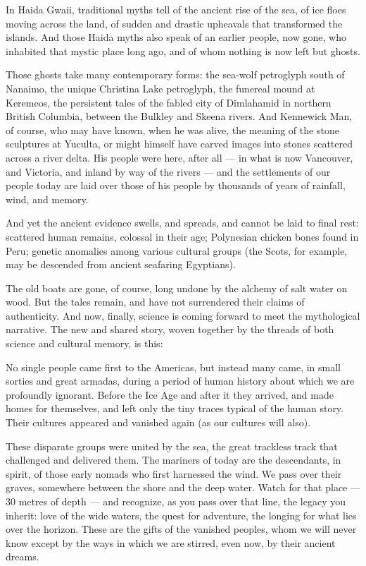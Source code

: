 \documentclass[letterpaper,oneside]{memoir}
\begin{document}
\begin{description}
In Haida Gwaii, traditional myths tell of the ancient rise of the sea,
of ice floes moving across the land, of sudden and drastic upheavals
that transformed the islands. And those Haida myths also speak of an
earlier people, now gone, who inhabited that mystic place long ago,
and of whom nothing is now left but ghosts.

Those ghosts take many contemporary forms: the sea-wolf petroglyph
south of Nanaimo, the unique Christina Lake petroglyph, the funereal
mound at Keremeos, the persistent tales of the fabled city of
Dimlahamid in northern British Columbia, between the Bulkley and
Skeena rivers. And Kennewick Man, of course, who may have known, when
he was alive, the meaning of the stone sculptures at Yuculta, or might
himself have carved images into stones scattered across a river delta.
His people were here, after all --- in what is now Vancouver, and
Victoria, and inland by way of the rivers --- and the settlements of
our people today are laid over those of his people by thousands of
years of rainfall, wind, and memory.

And yet the ancient evidence swells, and spreads, and cannot be laid
to final rest: scattered human remains, colossal in their age;
Polynesian chicken bones found in Peru; genetic anomalies among
various cultural groups (the Scots, for example, may be descended from
ancient seafaring Egyptians).

The old boats are gone, of course, long undone by the alchemy of salt
water on wood. But the tales remain, and have not surrendered their
claims of authenticity. And now, finally, science is coming forward to
meet the mythological narrative. The new and shared story, woven
together by the threads of both science and cultural memory, is this:

No single people came first to the Americas, but instead many came, in
small sorties and great armadas, during a period of human history
about which we are profoundly ignorant. Before the Ice Age and after
it they arrived, and made homes for themselves, and left only the tiny
traces typical of the human story. Their cultures appeared and
vanished again (as our cultures will also).

These disparate groups were united by the sea, the great trackless
track that challenged and delivered them. The mariners of today are
the descendants, in spirit, of those early nomads who first harnessed
the wind. We pass over their graves, somewhere between the shore and
the deep water. Watch for that place --- 30 metres of depth --- and
recognize, as you pass over that line, the legacy you inherit: love of
the wide waters, the quest for adventure, the longing for what lies
over the horizon. These are the gifts of the vanished peoples, whom we
will never know except by the ways in which we are stirred, even now,
by their ancient dreams.



\end{description}
\end{document}
